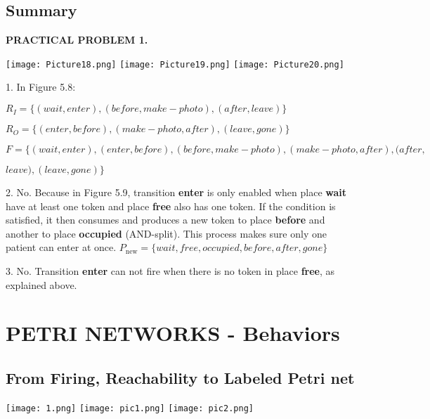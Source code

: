 \documentclass[a4paper]{article}
\begin{document}
\subsection{Summary}
\par\null\par
\textbf{PRACTICAL PROBLEM 1.}
\begin{center}
    \texttt{[image: Picture18.png]}
    \texttt{[image: Picture19.png]}
    \texttt{[image: Picture20.png]}
\end{center}
\par\null\par
1. In Figure 5.8:
\par
$R_I = \{(wait, enter), (before, make-photo), (after, leave)\}$\par
$R_O = \{(enter, before), (make-photo, after), (leave, gone)\}$\par
$F = \{(wait, enter), (enter, before), (before, make-photo), (make-photo, after), (after,$\par $leave), (leave, gone)\}$
\par\null\par
2. No. Because in Figure 5.9, transition \textbf{enter} is only enabled when place \textbf{wait} have at least one token and place \textbf{free} also has one token. If the condition is satisfied, it then consumes and produces a new token to place \textbf{before} and another to place \textbf{occupied} (AND-split). This process makes sure only one patient can enter at once.
$P_\text{new} = \{wait, free, occupied, before, after, gone\}$
\par\null\par
3. No. Transition \textbf{enter} can not fire when there is no token in place \textbf{free}, as explained above.


\vspace{1 cm}

\section{PETRI NETWORKS - Behaviors}
	\subsection{From Firing, Reachability to Labeled Petri net}
	
\begin{center}
    \texttt{[image: 1.png]}
    \texttt{[image: pic1.png]}
    \texttt{[image: pic2.png]}
\end{center}
\end{document}
